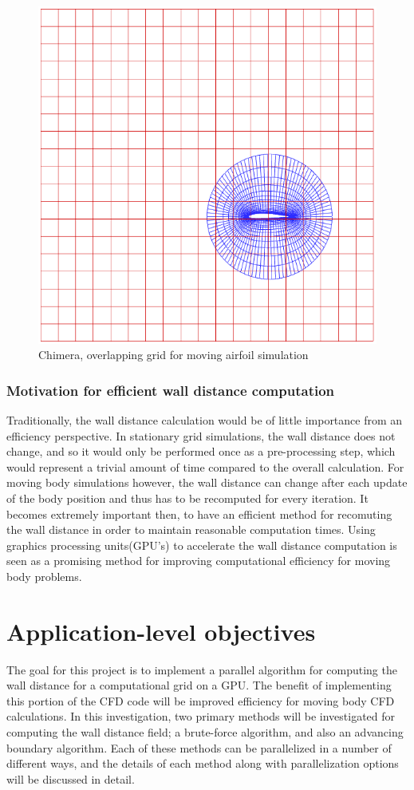 \documentclass[]{aiaa-tc}%
\begin{document}
\begin{figure}
  \centering
  \includegraphics[width=0.3\linewidth]{figures/chimera_grid}
  \caption{Chimera, overlapping grid for moving airfoil simulation}
  \label{f:chimera_grid}
\end{figure}


\subsubsection{Motivation for efficient wall distance computation}
Traditionally, the wall distance calculation would be of little
importance from an efficiency perspective. In stationary grid
simulations, the wall distance does not change, and so it would only
be performed once as a pre-processing step, which would represent a
trivial amount of time compared to the overall calculation. For moving
body simulations however, the wall distance can change after each
update of the body position and thus has to be recomputed for every
iteration. It becomes extremely important then, to have an efficient
method for recomuting the wall distance in order to maintain
reasonable computation times. Using graphics processing units(GPU's)
to accelerate the wall distance computation is seen as a promising
method for improving computational efficiency for moving body
problems.

\section{Application-level objectives}
The goal for this project is to implement a parallel algorithm for
computing the wall distance for a computational grid on a GPU. The
benefit of implementing this portion of the CFD code will be improved
efficiency for moving body CFD calculations. In this investigation,
two primary methods will be investigated for computing the wall
distance field; a brute-force algorithm, and also an advancing
boundary algorithm. Each of these methods can be parallelized in a
number of different ways, and the details of each method along with
parallelization options will be discussed in detail. \\
\end{document}
